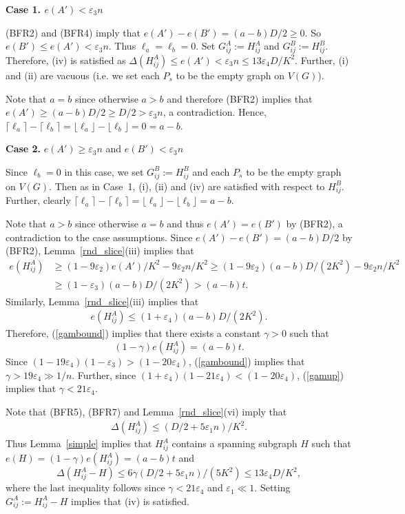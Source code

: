 \documentclass{memo-l}
\def\eps{\varepsilon}
\numberwithin{section}{chapter}
\numberwithin{equation}{section}
\numberwithin{firstthm}{section}
\numberwithin{figure}{section}
\begin{document}
{\medskip

\noindent
{\bf Case 1. $e(A') < \eps _3 n$}

(BFR2) and (BFR4) imply that $e(A')-e(B') =(a-b)D/2 \geq 0$. So $e(B') \leq e(A') < \eps _3 n$.
Thus $\ell _a =\ell _b =0$. Set $G^A _{ij}:=H^A _{ij}$ and $G^B _{ij}:=H^B _{ij}$.
Therefore, (iv) is satisfied as $\Delta(H_{ij}^A) \leq e(A') < \eps _3 n \leq 13\eps_4 D/K^2$.
Further, (i) and (ii) are vacuous (i.e. we set each $P_s$ to be the empty graph on $V(G)$). 

Note that $a=b$ since otherwise $a>b$ and therefore (BFR2) implies that $e(A') \geq (a-b)D/2 \geq D/2 > \eps_3 n$, a contradiction.
Hence, $\lceil \ell _a \rceil -\lceil \ell _b \rceil= \lfloor \ell _a \rfloor -\lfloor \ell _b \rfloor =0=a-b$.

\medskip

\noindent
{\bf Case 2.} $e(A') \geq \eps _3 n$ and $e(B') < \eps _3 n$

Since $\ell _b=0$ in this case, we set $G^B _{ij}:=H^B _{ij}$ and each $P_s$ to be the empty graph on $V(G)$. Then as in Case~1, 
(i), (ii) and (iv) are satisfied with respect to $H^B _{ij}$. Further, clearly 
$\lceil \ell _a \rceil -\lceil \ell _b \rceil= \lfloor \ell _a \rfloor -\lfloor \ell _b \rfloor =a-b$.

Note that $a>b$ since otherwise $a=b$ and thus $e(A')=e(B')$ by (BFR2), a contradiction
to the case assumptions. Since $e(A') -e(B') =(a-b)D/2$ by (BFR2), Lemma~\ref{rnd_slice}(iii)
implies that 
\begin{align}
\nonumber
e (H^A _{ij})& \geq (1-9 \eps _2) {e(A')}/{K^2}-9 \eps _2 n /K^2  \geq 
(1-9 \eps _2) (a-b)D/(2K^2) - 9 \eps _2 n /K^2 \\ 
& \geq (1- \eps _3)(a-b) D/(2K^2) > (a-b)t. \label{gambound}
\end{align}
Similarly, Lemma~\ref{rnd_slice}(iii) implies that 
\begin{align}\label{gamup}
e (H^A _{ij}) \leq (1+\eps _4)(a-b)D/(2K^2). 
\end{align}
Therefore, (\ref{gambound}) implies that there exists a constant $\gamma >0$ such that
$$(1-\gamma)e (H^A _{ij}) =(a-b)t.$$
Since $(1-19\eps _4 )(1-\eps _3) >(1-20\eps _4)$, (\ref{gambound}) implies that
$\gamma > 19 \eps _4 \gg 1/n$. Further, since $(1+\eps _4)(1-21 \eps _4) < (1-20 \eps _4)$,
(\ref{gamup}) implies that $\gamma < 21 \eps _4$.

Note that (BFR5), (BFR7) and Lemma~\ref{rnd_slice}(vi) imply that 
\begin{align}\label{boundup}
\Delta (H^A _{ij}) \leq (D/2+5 \eps _1 n)/K^2.
\end{align}
Thus Lemma~\ref{simple} implies that $H^A _{ij}$ contains a spanning subgraph $H$ such that
$e(H)=(1- \gamma ) e(H^A _{ij})=(a-b)t$ and 
$$\Delta (H^A _{ij} -H) \leq 6 \gamma (D/2+5 \eps _1 n)/(5K^2)
\leq 13 \eps _4 D/K^2,$$
where the last inequality follows since $ \gamma <21 \eps _4$ and $\eps _1 \ll 1$.
Setting $G^A _{ij}:=H^A _{ij} -H$ implies that (iv) is satisfied.

}
\end{document}
